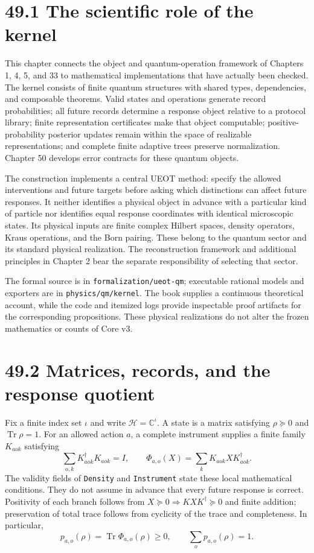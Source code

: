 \documentclass[
  11pt,
  oneside]{book}
\begin{document}
\section{49.1 The scientific role of the kernel}

This chapter connects the object and quantum-operation framework of
Chapters 1, 4, 5, and 33 to mathematical implementations that have
actually been checked. The kernel consists of finite quantum structures
with shared types, dependencies, and composable theorems. Valid states
and operations generate record probabilities; all future records
determine a response object relative to a protocol library; finite
representation certificates make that object computable;
positive-probability posterior updates remain within the space of
realizable representations; and complete finite adaptive trees preserve
normalization. Chapter 50 develops error contracts for these quantum
objects.

The construction implements a central UEOT method: specify the allowed
interventions and future targets before asking which distinctions can
affect future responses. It neither identifies a physical object in
advance with a particular kind of particle nor identifies equal response
coordinates with identical microscopic states. Its physical inputs are
finite complex Hilbert spaces, density operators, Kraus operations, and
the Born pairing. These belong to the quantum sector and its standard
physical realization. The reconstruction framework and additional
principles in Chapter 2 bear the separate responsibility of selecting
that sector.

The formal source is in \texttt{formalization/\allowbreak ueot-\allowbreak qm}; executable
rational models and exporters are in \texttt{physics/\allowbreak qm/\allowbreak kernel}. The
book supplies a continuous theoretical account, while the code and
itemized logs provide inspectable proof artifacts for the corresponding
propositions. These physical realizations do not alter the frozen
mathematics or counts of Core v3.

\section{49.2 Matrices, records, and the response quotient}

Fix a finite index set \(\iota\) and write
\(\mathcal H=\mathbb C^{\iota}\). A state is a matrix satisfying
\(\rho\succeq0\) and \(\operatorname{Tr}\rho=1\). For an allowed action
\(a\), a complete instrument supplies a finite family \(K_{aok}\)
satisfying \[
\sum_{o,k}K_{aok}^{\dagger}K_{aok}=I,
\qquad \Phi_{a,o}(X)=\sum_kK_{aok}XK_{aok}^{\dagger}.
\] The validity fields of \texttt{Density} and \texttt{Instrument} state
these local mathematical conditions. They do not assume in advance that
every future response is correct. Positivity of each branch follows from
\(X\succeq0\Rightarrow KXK^\dagger\succeq0\) and finite addition;
preservation of total trace follows from cyclicity of the trace and
completeness. In particular, \[
p_{a,o}(\rho)=\operatorname{Tr}\Phi_{a,o}(\rho)\ge0,
\qquad \sum_op_{a,o}(\rho)=1.
\]
\end{document}
